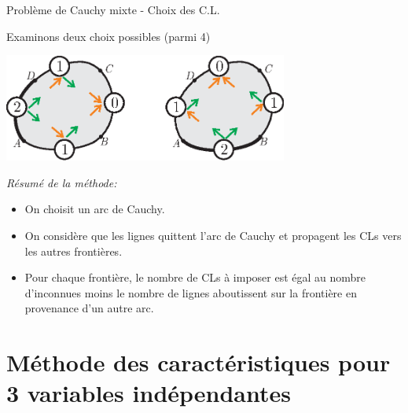 \documentclass[
mode=present,    %
paper=a4paper,   %
orient=landscape,
display=slides,   %
size=10pt,
style=romain   %
]{powerdot}
\begin{document}
\begin{slide}[toc=]{Problème de Cauchy mixte - Choix des C.L.}

Examinons deux choix possibles (parmi 4)

\bigskip

    \centerline{\includegraphics[width=0.7\textwidth]{bc2b.eps} }

\bigskip
\emph{Résumé de la méthode:}
\begin{itemize}
\item On choisit un arc de Cauchy.
\item On considère que les lignes quittent l'arc de Cauchy et propagent les CLs vers les autres frontières.
\item Pour chaque frontière, le nombre de CLs à imposer est égal au nombre d'inconnues moins le nombre de lignes aboutissent sur la frontière en provenance d'un autre arc.
\end{itemize}

\end{slide}


\section[toc=Carac. 3D]{Méthode des caractéristiques pour 3 variables indépendantes}
\end{document}
